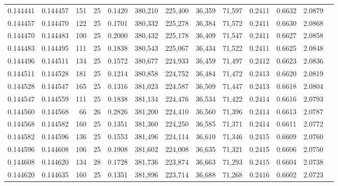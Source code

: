 \begin{tabular}{rrrrrrrrrrrrr}
0.144441 & 0.144457 &   151 &  25 &                                     0.1420 & 380,210 & 225,400 &  36,359 &  71,597 & 0.2411 & 0.6632 & 2.0879 \\
0.144457 & 0.144470 &   122 &  25 &                                     0.1701 & 380,332 & 225,278 &  36,384 &  71,572 & 0.2411 & 0.6630 & 2.0868 \\
0.144470 & 0.144483 &   100 &  25 &                                     0.2000 & 380,432 & 225,178 &  36,409 &  71,547 & 0.2411 & 0.6627 & 2.0858 \\
0.144483 & 0.144495 &   111 &  25 &                                     0.1838 & 380,543 & 225,067 &  36,434 &  71,522 & 0.2411 & 0.6625 & 2.0848 \\
0.144496 & 0.144511 &   134 &  25 &                                     0.1572 & 380,677 & 224,933 &  36,459 &  71,497 & 0.2412 & 0.6623 & 2.0836 \\
0.144511 & 0.144528 &   181 &  25 &                                     0.1214 & 380,858 & 224,752 &  36,484 &  71,472 & 0.2413 & 0.6620 & 2.0819 \\
0.144528 & 0.144547 &   165 &  25 &                                     0.1316 & 381,023 & 224,587 &  36,509 &  71,447 & 0.2413 & 0.6618 & 2.0804 \\
0.144547 & 0.144559 &   111 &  25 &                                     0.1838 & 381,134 & 224,476 &  36,534 &  71,422 & 0.2414 & 0.6616 & 2.0793 \\
0.144560 & 0.144568 &    66 &  26 &                                     0.2826 & 381,200 & 224,410 &  36,560 &  71,396 & 0.2414 & 0.6613 & 2.0787 \\
0.144568 & 0.144582 &   160 &  25 &                                     0.1351 & 381,360 & 224,250 &  36,585 &  71,371 & 0.2414 & 0.6611 & 2.0772 \\
0.144582 & 0.144596 &   136 &  25 &                                     0.1553 & 381,496 & 224,114 &  36,610 &  71,346 & 0.2415 & 0.6609 & 2.0760 \\
0.144596 & 0.144608 &   106 &  25 &                                     0.1908 & 381,602 & 224,008 &  36,635 &  71,321 & 0.2415 & 0.6606 & 2.0750 \\
0.144608 & 0.144620 &   134 &  28 &                                     0.1728 & 381,736 & 223,874 &  36,663 &  71,293 & 0.2415 & 0.6604 & 2.0738 \\
0.144620 & 0.144635 &   160 &  25 &                                     0.1351 & 381,896 & 223,714 &  36,688 &  71,268 & 0.2416 & 0.6602 & 2.0723 \\

\end{tabular}
